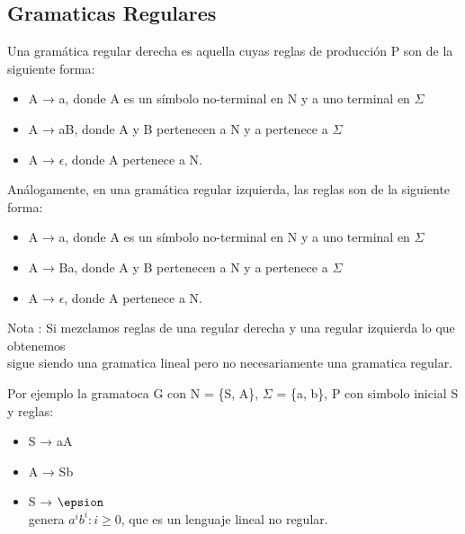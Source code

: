 \subsection{Gramaticas Regulares}\label{gramaticas-regulares}

Una gramática regular derecha es aquella cuyas reglas de producción P
son de la siguiente forma:

\begin{itemize}
\itemsep1pt\parskip0pt
\item
  A → a, donde A es un símbolo no-terminal en N y a uno terminal en
  \(\Sigma\)\\
\item
  A → aB, donde A y B pertenecen a N y a pertenece a \(\Sigma\)\\
\item
  A → \(\epsilon\), donde A pertenece a N.
\end{itemize}

Análogamente, en una gramática regular izquierda, las reglas son de la
siguiente forma:

\begin{itemize}
\itemsep1pt\parskip0pt
\item
  A → a, donde A es un símbolo no-terminal en N y a uno terminal en
  \(\Sigma\)
\item
  A → Ba, donde A y B pertenecen a N y a pertenece a \(\Sigma\)\\
\item
  A → \(\epsilon\), donde A pertenece a N.
\end{itemize}

Nota : Si mezclamos reglas de una regular derecha y una regular
izquierda lo que obtenemos\\sigue siendo una gramatica lineal pero no
necesariamente una gramatica regular.

Por ejemplo la gramatoca G con N = \{S, A\}, \(\Sigma\) = \{a, b\}, P
con simbolo inicial S y reglas:

\begin{itemize}
\itemsep1pt\parskip0pt
\item
  S → aA\\
\item
  A → Sb\\
\item
  S → \(\epsion\)\\genera \(a^ib^i : i \geq 0\), que es un lenguaje
  lineal no regular.
\end{itemize}
